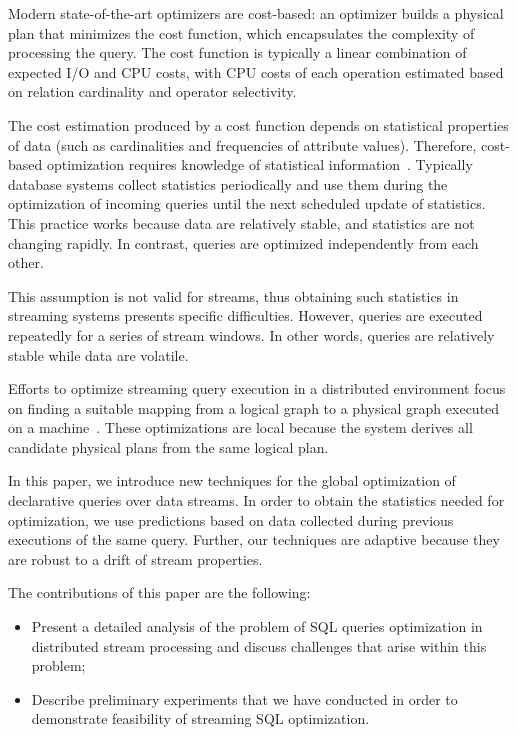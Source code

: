 Modern state-of-the-art optimizers are cost-based: an optimizer builds a physical plan that minimizes the cost function, which encapsulates the complexity of processing the query. 
The cost function is typically a linear combination of expected I/O and CPU costs, with CPU costs of each operation estimated based on relation cardinality and operator selectivity. 

The cost estimation produced by a cost function depends on statistical properties of data (such as cardinalities and frequencies of attribute values). Therefore, cost-based optimization requires knowledge of statistical information~\cite{Neumann2018optimization}.  
Typically database systems collect statistics periodically and use them during the optimization of incoming queries until the next scheduled update of statistics. 
This practice works because data are relatively stable, and statistics are not changing rapidly. In contrast, queries are optimized independently from each other. 

This assumption is not valid for streams, thus obtaining such statistics in streaming systems presents specific difficulties. However, queries are executed repeatedly for a series of stream windows. In other words, queries are relatively stable while data are volatile.

Efforts to optimize streaming query execution in a distributed environment focus on finding a suitable mapping from a logical graph to a physical graph executed on a machine~\cite{grulich2020grizzly, gedik2009code, kroll2019arc, schneider2012auto, gedik2008spade}.
These optimizations are local because the system derives all candidate physical plans from the same logical plan.  

In this paper, we introduce new techniques for the global optimization of declarative queries over data streams. 
In order to obtain the statistics needed for optimization, we use predictions based on data collected during previous executions of the same query. 
Further, our techniques are adaptive because they are robust to a drift of stream properties. 

The  contributions of this paper are the following:
\begin{itemize}
    \item Present a detailed analysis of the problem of SQL queries optimization in distributed stream processing and discuss challenges that arise within this problem;
    \item Describe preliminary experiments that we have conducted in order to demonstrate feasibility of streaming SQL optimization.
\end{itemize}

